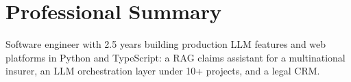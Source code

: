 \section{Professional Summary}
{\small Software engineer with 2.5 years building production LLM features and web platforms in Python and TypeScript: a RAG claims assistant for a multinational insurer, an LLM orchestration layer under 10+ projects, and a legal CRM.\par}
\vspace{2pt}
